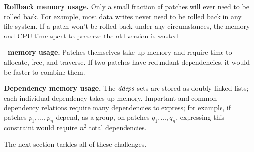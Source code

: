 \textbf{Rollback memory usage.}
%
Only a small fraction of patches will ever need to be rolled back.
%
For example, most data writes never need to be rolled back in any file
system.
%
If a patch won't be rolled back under any circumstances, the memory and
CPU time spent to preserve the old version is wasted.


\textbf{\Patch\ memory usage.}
%
Patches themselves take up memory and require time to allocate, free, and
traverse.
%
If two patches have redundant dependencies, it would be faster to combine
them.


\textbf{Dependency memory usage.}
%
The $\PDDepset{}$ sets are stored as doubly linked lists; each individual
dependency takes up memory.
%
Important and common dependency relations require many dependencies to
express; for example, if patches $p_1,\dots,p_n$ depend, as a group, on
patches $q_1,\dots,q_n$, expressing this constraint would require $n^2$
total dependencies.


The next section tackles all of these challenges.

